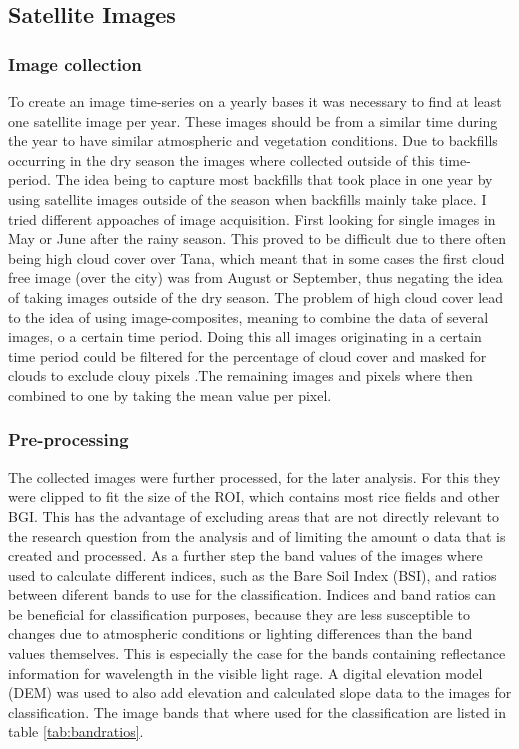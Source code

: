 \documentclass[11pt, letterpaper, oneside]{article}
\begin{document}
\subsection{Satellite Images}

\subsubsection{Image collection}
To create an image time-series on a yearly bases it was necessary to find at least one satellite image per year. These images should be from a similar time during the year to have similar atmospheric and vegetation conditions. Due to backfills occurring in the dry season the images where collected outside of this time-period. The idea being to capture most backfills that took place in one year by using satellite images outside of the season when backfills mainly take place. I tried different appoaches of image acquisition. First looking for single images in May or June after the rainy season. This proved to be difficult due to there often being high cloud cover over Tana, which meant that in some cases the first cloud free image (over the city) was from August or September, thus negating the idea of taking images outside of the dry season. The problem of high cloud cover lead to the idea of using image-composites, meaning to combine the data of several images, o a certain time period. Doing this all images originating in a certain time period could  be filtered for the percentage of cloud cover and  masked for clouds to exclude clouy pixels .The remaining images and pixels where then combined to one by taking the mean value per pixel.
\subsubsection{Pre-processing}
The collected images were further processed, for the later analysis. For this they were clipped to fit the size of the ROI, which contains most rice fields and other BGI. This has the advantage of excluding areas that are not directly relevant to the research question from the analysis and of limiting the amount o data that is created and processed. As a further step the band values of the images where used to calculate different indices, such as the Bare Soil Index (BSI), and ratios between diferent bands to use for the classification. Indices and band ratios can be beneficial for classification purposes, because they are less susceptible to changes due to atmospheric conditions or lighting differences than the band values themselves. This is especially the case for the bands containing reflectance information for wavelength in the visible light rage. A digital elevation model (DEM) was used to also add elevation and calculated slope data to the images for classification. The image bands that where used for the classification are listed in table \ref{tab:bandratios}.
\end{document}
